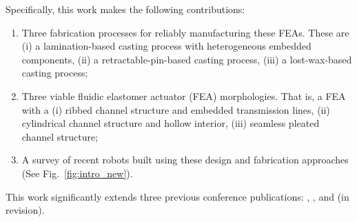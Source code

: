 Specifically, this work makes the following contributions:
\begin{enumerate}
  \item Three fabrication processes for reliably manufacturing these FEAs. These are (i) a lamination-based casting process with heterogeneous embedded components, (ii) a retractable-pin-based casting process, (iii) a lost-wax-based casting process;
 \item Three viable fluidic elastomer actuator (FEA) morphologies. That is, a FEA with a (i) ribbed channel structure and embedded transmission lines, (ii) cylindrical channel structure and hollow interior, (iii) seamless pleated channel structure;
  \item A survey of recent robots built using these design and fabrication approaches (See Fig.~\ref{fig:intro_new}).
\end{enumerate}
This work significantly extends three previous conference publications: \citep{marchese2014design}, \citep{marchese2014whole}, and \citep{katzschmann2015autonomous} (in revision). %